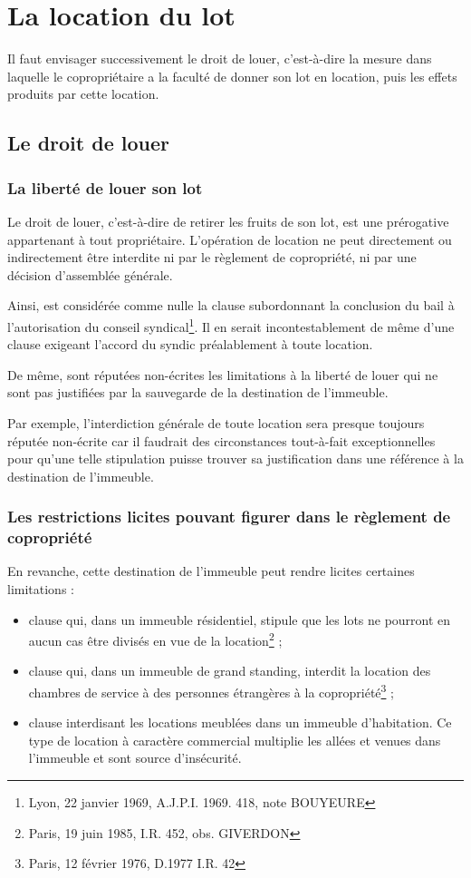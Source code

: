 \chapter{La location du lot}

Il faut envisager successivement le droit de louer, c'est-à-dire la mesure dans laquelle le copropriétaire a la faculté de donner son lot en location, puis les effets produits par cette location.

\section{Le droit de louer}

	\subsection{La liberté de louer son lot}
	
		Le droit de louer, c'est-à-dire de retirer les fruits de son lot, est une prérogative appartenant à tout propriétaire. L'opération de location ne peut directement ou indirectement être interdite ni par le règlement de copropriété, ni par une décision d'assemblée générale.
		
		Ainsi, est considérée comme nulle la clause subordonnant la conclusion du bail à l'autorisation du conseil syndical\footnote{Lyon, 22 janvier 1969, A.J.P.I. 1969. 418, note BOUYEURE}. Il en serait incontestablement de même d'une clause exigeant l'accord du syndic préalablement à toute location.
		
		De même, sont réputées non-écrites les limitations à la liberté de louer qui ne sont pas justifiées par la sauvegarde de la destination de l'immeuble.
		
		Par exemple, l'interdiction générale de toute location sera presque toujours réputée non-écrite car il faudrait des circonstances tout-à-fait exceptionnelles pour qu'une telle stipulation puisse trouver sa justification dans une référence à la destination de l'immeuble.
	
	\subsection{Les restrictions licites pouvant figurer dans le règlement de copropriété}
	
	En revanche, cette destination de l'immeuble peut rendre licites certaines limitations :
	\begin{itemize}
		\item clause qui, dans un immeuble résidentiel, stipule que les lots ne pourront en aucun cas être divisés en vue de la location\footnote{Paris, 19 juin 1985, I.R. 452, obs. GIVERDON} ;
		\item clause qui, dans un immeuble de grand standing, interdit la location des chambres de service à des personnes étrangères à la copropriété\footnote{Paris, 12 février 1976, D.1977 I.R. 42} ;
		\item clause interdisant les locations meublées dans un immeuble d’habitation. Ce type de location à caractère commercial multiplie les allées et venues dans l'immeuble et sont source d'insécurité.
	\end{itemize}
	
